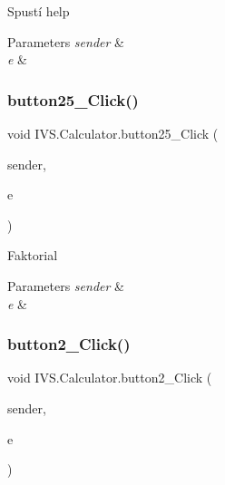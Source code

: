 Spustí help 


\begin{DoxyParams}{Parameters}
{\em sender} & \\
\hline
{\em e} & \\
\hline
\end{DoxyParams}
\mbox{\label{class_i_v_s_1_1_calculator_a59df8db86ef51c3c105143abd36ae3da}} 
\subsubsection{\texorpdfstring{button25\+\_\+\+Click()}{button25\_Click()}}
{\footnotesize\ttfamily void I\+V\+S.\+Calculator.\+button25\+\_\+\+Click (\begin{DoxyParamCaption}\item[{object}]{sender,  }\item[{Event\+Args}]{e }\end{DoxyParamCaption})\hspace{0.3cm}{\ttfamily [protected]}}



Faktorial 


\begin{DoxyParams}{Parameters}
{\em sender} & \\
\hline
{\em e} & \\
\hline
\end{DoxyParams}
\mbox{\label{class_i_v_s_1_1_calculator_aa6a17fb7e856187dfd9b8964e67e2f57}} 
\subsubsection{\texorpdfstring{button2\+\_\+\+Click()}{button2\_Click()}}
{\footnotesize\ttfamily void I\+V\+S.\+Calculator.\+button2\+\_\+\+Click (\begin{DoxyParamCaption}\item[{object}]{sender,  }\item[{Event\+Args}]{e }\end{DoxyParamCaption})\hspace{0.3cm}{\ttfamily [protected]}}



